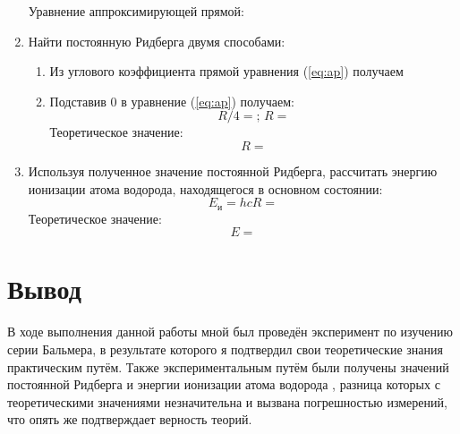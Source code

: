 \documentclass[12pt]{article}
\let\oldref\ref
\renewcommand{\ref}[1]{(\oldref{#1})}
\begin{document}
\begin{enumerate}[wide, labelwidth=!, labelindent=0pt]
        Уравнение аппроксимирующей прямой: 
        \begin{equation}
            \label{eq:ap}
        \end{equation}
        \item Найти постоянную Ридберга двумя способами: 
        \begin{enumerate}
            \item Из углового коэффициента прямой уравнения \ref{eq:ap} получаем %
            \item Подставив $ 0 $ в уравнение \ref{eq:ap} получаем:
            \begin{equation*}
                R/4 =  %
                ; \, R = %
            \end{equation*}
            Теоретическое значение:
            \begin{equation*}
                R = %
            \end{equation*}
        \end{enumerate}
        \item Используя  полученное  значение  постоянной  Ридберга, рассчитать энергию ионизации атома водорода, находящегося в основном состоянии:
        \begin{equation*}
            E_и = hcR = %
        \end{equation*}
        Теоретическое значение:
            \begin{equation*}
                E = %
            \end{equation*}
    \end{enumerate}
    \section*{Вывод}
    В ходе выполнения данной работы мной был проведён эксперимент по изучению серии Бальмера, в результате которого я подтвердил свои теоретические знания практическим путём. Также экспериментальным путём были получены значений постоянной Ридберга 
    и энергии ионизации атома водорода
    , разница которых с теоретическими значениями незначительна и вызвана погрешностью измерений, что опять же подтверждает верность теорий.  
\end{document}
